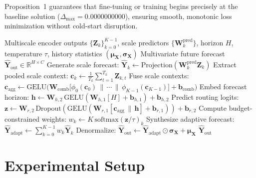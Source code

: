 \documentclass[journal]{IEEEtran}
\begin{document}
Proposition~1 guarantees that fine-tuning or training begins precisely at the baseline solution ($\Delta_{\max} = 0.0000000000$), ensuring smooth, monotonic loss minimization without cold-start disruption.

\begin{algorithm}[t]
\caption{Adaptive-FMM Decoding Procedure}
\label{alg:fmm}
\small
\begin{algorithmic}[1]
\REQUIRE Multiscale encoder outputs $\{\mathbf{Z}_k\}_{k=0}^{K-1}$, scale predictors $\{\mathbf{W}_k^{\text{pred}}\}$, horizon $H$, temperature $\tau$, history statistics $(\boldsymbol{\mu}_{\mathbf{X}},\boldsymbol{\sigma}_{\mathbf{X}})$
\ENSURE Multivariate future forecast $\hat{\mathbf{Y}}_{\text{out}}\in\mathbb{R}^{H\times C}$
  \STATE Generate scale forecast: $\hat{\mathbf{Y}}_k \leftarrow \mathrm{Projection}(\mathbf{W}_k^{\text{pred}}\mathbf{Z}_k)$
  \STATE Extract pooled scale context: $\mathbf{c}_k \leftarrow \frac{1}{T_k}\sum_{t=1}^{T_k}\mathbf{Z}_{k,t}$
\ENDFOR
\STATE Fuse scale contexts: $\mathbf{c}_{\text{agg}} \leftarrow \mathrm{GELU}\Big(\mathbf{W}_{\text{comb}}\big[\phi_0(\mathbf{c}_0)\,\|\,\cdots\,\|\,\phi_{K-1}(\mathbf{c}_{K-1})\big]+\mathbf{b}_{\text{comb}}\Big)$
\STATE Embed forecast horizon: $\mathbf{h} \leftarrow \mathbf{W}_{h,2}\,\mathrm{GELU}(\mathbf{W}_{h,1}[H]+\mathbf{b}_{h,1})+\mathbf{b}_{h,2}$
\STATE Predict routing logits: $\mathbf{z} \leftarrow \mathbf{W}_{r,2}\,\mathrm{Dropout}(\mathrm{GELU}(\mathbf{W}_{r,1}[\mathbf{c}_{\text{agg}}\,\|\,\mathbf{h}]+\mathbf{b}_{r,1}))+\mathbf{b}_{r,2}$
\STATE Compute budget-constrained weights: $w_k \leftarrow K\,\mathrm{softmax}(\mathbf{z}/\tau)_k$
\STATE Synthesize adaptive forecast: $\hat{\mathbf{Y}}_{\text{adapt}} \leftarrow \sum_{k=0}^{K-1} w_k\hat{\mathbf{Y}}_k$
\STATE Denormalize: $\hat{\mathbf{Y}}_{\text{out}} \leftarrow \hat{\mathbf{Y}}_{\text{adapt}}\odot\boldsymbol{\sigma}_{\mathbf{X}}+\boldsymbol{\mu}_{\mathbf{X}}$
\RETURN $\hat{\mathbf{Y}}_{\text{out}}$
\end{algorithmic}
\end{algorithm}

\section{Experimental Setup}
\label{sec:setup}
\end{document}

